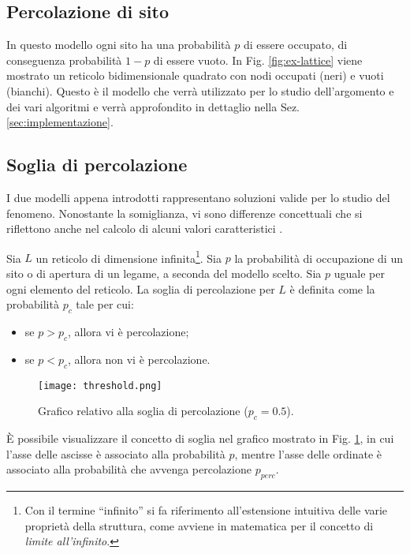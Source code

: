 \subsection*{Percolazione di sito}
In questo modello ogni sito ha una probabilità $p$ di essere occupato, di conseguenza
probabilità $1-p$ di essere vuoto. In Fig. \ref{fig:ex-lattice} viene mostrato un 
reticolo bidimensionale quadrato con nodi occupati (neri) e vuoti (bianchi). Questo è 
il modello che verrà utilizzato per lo studio dell'argomento e dei vari algoritmi e verrà
approfondito in dettaglio nella Sez. \ref{sec:implementazione}.

\subsection*{Soglia di percolazione}
I due modelli appena introdotti rappresentano soluzioni valide per lo studio 
del fenomeno. Nonostante la somiglianza, vi sono differenze concettuali che si 
riflettono anche nel calcolo di alcuni valori caratteristici \cite{weisstein-bond,weisstein-site,weisstein-threshold}.

\begin{definition}
    Sia $L$ un reticolo di dimensione infinita\footnote{Con il termine ``infinito'' 
    si fa riferimento all'estensione intuitiva delle varie proprietà della struttura,
    come avviene in matematica per il concetto di \textit{limite all'infinito}.}. 
    Sia $p$ la probabilità di occupazione di un sito o di apertura 
    di un legame, a seconda del modello scelto. 
    Sia $p$ uguale per ogni elemento del reticolo.
    La soglia di percolazione per $L$ è definita come la 
    probabilità $p_c$ tale per cui:
    \begin{itemize}
        \item se $p > p_c$, allora vi è percolazione;
        \item se $p < p_c$, allora non vi è percolazione.
    \end{itemize}
\end{definition}

\begin{figure}
    \centering
    \texttt{[image: threshold.png]}
    \caption{Grafico relativo alla soglia di percolazione ($p_c=0.5$).}
    \label{fig:threshold}
\end{figure}

È possibile visualizzare il concetto di soglia nel grafico mostrato in 
Fig. \ref{fig:threshold}, in cui l'asse delle ascisse è associato alla 
probabilità $p$, mentre l'asse delle ordinate è associato alla probabilità
che avvenga percolazione $p_{perc}$.

